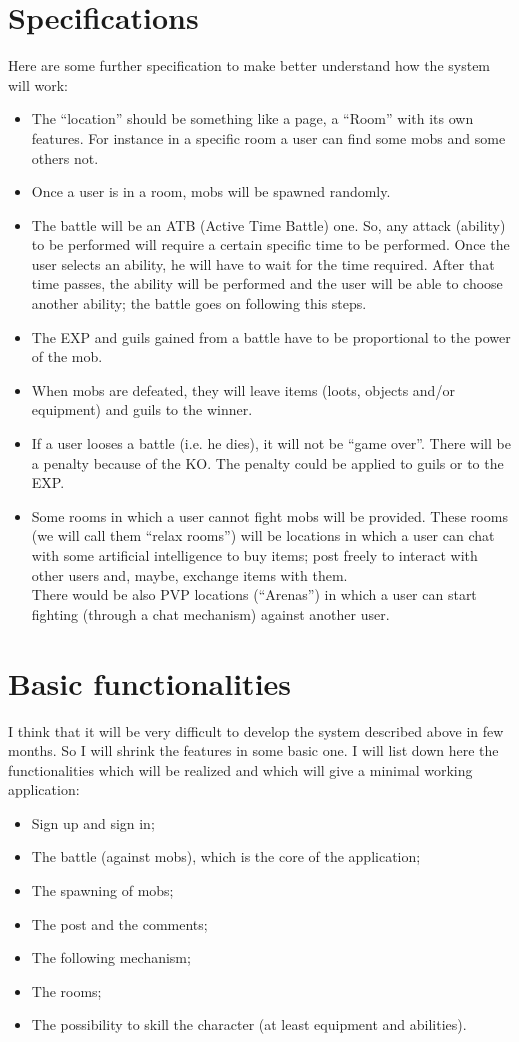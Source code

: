 	\section{Specifications}
		Here are some further specification to make better understand how the system will work:
		\begin{itemize}
			\item The ``location'' should be something like a \Facebook{} page, a ``Room'' with its own features. For instance in a specific room a user can find some mobs and some others not.
			\item Once a user is in a room, mobs will be spawned randomly.
			\item The battle will be an ATB (Active Time Battle) one. So, any attack (ability) to be performed will require a certain specific time to be performed. Once the user selects an ability, he will have to wait for the time required. After that time passes, the ability will be performed and the user will be able to choose another ability; the battle goes on following this steps.
			\item The EXP and guils gained from a battle have to be proportional to the power of the mob.
			\item When mobs are defeated, they will leave items (loots, objects and/or equipment) and guils to the winner.
			\item If a user looses a battle (i.e. he dies), it will not be ``game over''. There will be a penalty because of the KO. The penalty could be applied to guils or to the EXP.
			\item Some rooms in which a user cannot fight mobs will be provided. These rooms (we will call them ``relax rooms'') will be locations in which a user can chat with some artificial intelligence to buy items; post freely to interact with other users and, maybe, exchange items with them.\\
			There would be also PVP locations (``Arenas'') in which a user can start fighting (through a chat mechanism) against another user.
		\end{itemize}

	\section{Basic functionalities}
	I think that it will be very difficult to develop the system described above in few months. So I will shrink the features in some basic one. I will list down here the functionalities which will be realized and which will give a minimal working application:
	\begin{itemize}
		\item Sign up and sign in;
	 	\item The battle (against mobs), which is the core of the application;
	 	\item The spawning of mobs;
	 	\item The post and the comments;
	 	\item The following mechanism;
	 	\item The rooms;
	 	\item The possibility to skill the character (at least equipment and abilities).
	\end{itemize} 